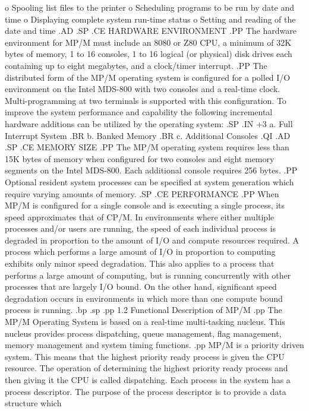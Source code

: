       o Spooling list files to the printer
      o Scheduling programs to be run by date and time
      o Displaying complete system run-time status
      o Setting and reading of the date and time
.AD
.SP
.CE
HARDWARE ENVIRONMENT
.PP
The hardware environment for MP/M must include an 8080 or Z80 CPU,
a minimum of 32K bytes of memory, 1 to 16 consoles, 1 to 16
logical (or physical) disk drives
each containing up to eight megabytes, and a clock/timer interrupt.
.PP
The distributed form of the MP/M operating system is configured for
a polled I/O environment on the Intel MDS-800 with two consoles
and a real-time clock.  Multi-programming at two terminals is supported with this
configuration.  To improve the system performance and
capability the following incremental hardware additions can be utilized
by the operating system:
.SP
.IN +3
   a. Full Interrupt System
.BR
   b. Banked Memory
.BR
   c. Additional Consoles
.QI
.AD
.SP
.CE
MEMORY SIZE
.PP
The MP/M operating system requires less than
15K bytes of memory when configured for
two consoles and eight memory segments on the Intel MDS-800.
Each additional console
requires 256 bytes.
.PP
Optional resident system processes can be specified at system
generation which require varying amounts of memory.
.SP
.CE
PERFORMANCE
.PP
When MP/M is configured for a single console and is executing
a single process, its speed approximates that of CP/M.
In environments where either multiple processes and/or users are
running, the speed of each individual process is degraded in
proportion to the amount of I/O and compute resources required.
A process
which performs a large amount of I/O in proportion to computing
exhibits only minor speed degradation.  This also applies to a process
that performs a large amount of computing, but is running concurrently
with other processes that are largely I/O bound.  On the other hand,
significant speed degradation occurs in environments in which
more than one compute bound process is running.
.bp
.sp
.pp
1.2  Functional Description of MP/M
.pp
The MP/M Operating System is based on a real-time multi-tasking
nucleus.  This nucleus provides process dispatching, queue management,
flag management, memory management and system timing functions.
.pp
MP/M is a priority driven system.  This means that the highest priority
ready process is given the CPU resource.  The operation of determining
the highest priority ready process and then giving it the CPU is called
dispatching.  Each process in the system has a process descriptor.  The
purpose of the process descriptor is to provide a data structure which
